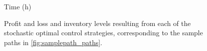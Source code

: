 \documentclass[12pt,letterpaper]{report}
\begin{document}
\begin{figure}
Time (h)

\vspace{1cm}%
  \caption[Comparison of P\&L and inventory on the sample path]{Profit and loss and inventory levels resulting from each of the stochastic optimal control strategies, corresponding to the sample paths in \autoref{fig:samplepath_paths}.}\label{fig:samplepath_pnl_inv}%
\end{figure}
\end{document}
